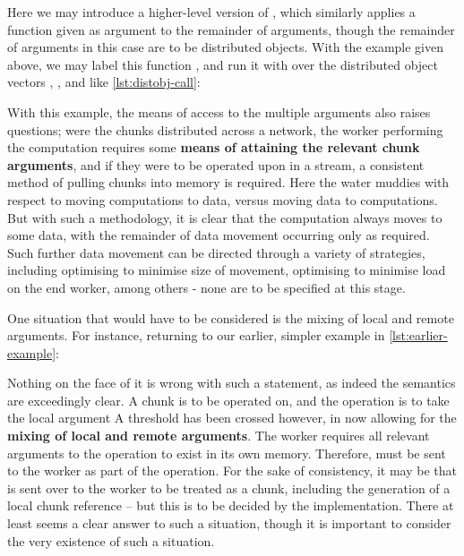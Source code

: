 
Here we may introduce a higher-level version of ,
which similarly applies a function given as argument to the remainder of
arguments, though the remainder of arguments in this case are to be
distributed objects. With the example given above, we may label this
function , and run it with 
over the distributed object vectors , , and
 like \cref{lst:distobj-call}:


With this example, the means of access to the multiple arguments also
raises questions; were the chunks distributed across a network, the
worker performing the computation requires some \textbf{means of
    attaining the relevant chunk arguments}, and if they were to be operated
upon in a stream, a consistent method of pulling chunks into memory is
required. Here the water muddies with respect to moving computations to
data, versus moving data to computations. But with such a methodology,
it is clear that the computation always moves to some data, with the
remainder of data movement occurring only as required. Such further data
movement can be directed through a variety of strategies, including
optimising to minimise size of movement, optimising to minimise load on
the end worker, among others - none are to be specified at this stage.

One situation that would have to be considered is the mixing of local
and remote arguments. For instance, returning to our earlier, simpler
example in \cref{lst:earlier-example}:


Nothing on the face of it is wrong with such a statement, as indeed the
semantics are exceedingly clear. A chunk is to be operated on, and the
operation is to take the local argument  A threshold
has been crossed however, in now allowing for the \textbf{mixing of
    local and remote arguments}. The worker requires all relevant arguments
to the operation to exist in its own memory. Therefore,
 must be sent to the worker as part of the operation.
For the sake of consistency, it may be that  is sent over
to the worker to be treated as a chunk, including the generation of a
local chunk reference -- but this is to be decided by the
implementation. There at least seems a clear answer to such a situation,
though it is important to consider the very existence of such a
situation.

